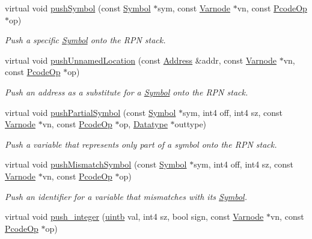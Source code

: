 \begin{DoxyCompactItemize}
virtual void \mbox{\hyperlink{class_print_c_a22e493008d4ba06482b42fe1875be235}{push\+Symbol}} (const \mbox{\hyperlink{class_symbol}{Symbol}} $\ast$sym, const \mbox{\hyperlink{class_varnode}{Varnode}} $\ast$vn, const \mbox{\hyperlink{class_pcode_op}{Pcode\+Op}} $\ast$op)
\begin{DoxyCompactList}\small\item\em Push a specific \mbox{\hyperlink{class_symbol}{Symbol}} onto the R\+PN stack. \end{DoxyCompactList}\item 
virtual void \mbox{\hyperlink{class_print_c_a5d9f2db7f218e2e994b741940155db52}{push\+Unnamed\+Location}} (const \mbox{\hyperlink{class_address}{Address}} \&addr, const \mbox{\hyperlink{class_varnode}{Varnode}} $\ast$vn, const \mbox{\hyperlink{class_pcode_op}{Pcode\+Op}} $\ast$op)
\begin{DoxyCompactList}\small\item\em Push an address as a substitute for a \mbox{\hyperlink{class_symbol}{Symbol}} onto the R\+PN stack. \end{DoxyCompactList}\item 
virtual void \mbox{\hyperlink{class_print_c_a0e8ab66b834858fbace8fd20357b5a63}{push\+Partial\+Symbol}} (const \mbox{\hyperlink{class_symbol}{Symbol}} $\ast$sym, int4 off, int4 sz, const \mbox{\hyperlink{class_varnode}{Varnode}} $\ast$vn, const \mbox{\hyperlink{class_pcode_op}{Pcode\+Op}} $\ast$op, \mbox{\hyperlink{class_datatype}{Datatype}} $\ast$outtype)
\begin{DoxyCompactList}\small\item\em Push a variable that represents only part of a symbol onto the R\+PN stack. \end{DoxyCompactList}\item 
virtual void \mbox{\hyperlink{class_print_c_aaa8e530589a3d446db8f76b9a211f0fa}{push\+Mismatch\+Symbol}} (const \mbox{\hyperlink{class_symbol}{Symbol}} $\ast$sym, int4 off, int4 sz, const \mbox{\hyperlink{class_varnode}{Varnode}} $\ast$vn, const \mbox{\hyperlink{class_pcode_op}{Pcode\+Op}} $\ast$op)
\begin{DoxyCompactList}\small\item\em Push an identifier for a variable that mismatches with its \mbox{\hyperlink{class_symbol}{Symbol}}. \end{DoxyCompactList}\item 
virtual void \mbox{\hyperlink{class_print_c_aa85a02ccc13756ecac61350ffd409e80}{push\+\_\+integer}} (\mbox{\hyperlink{types_8h_a2db313c5d32a12b01d26ac9b3bca178f}{uintb}} val, int4 sz, bool sign, const \mbox{\hyperlink{class_varnode}{Varnode}} $\ast$vn, const \mbox{\hyperlink{class_pcode_op}{Pcode\+Op}} $\ast$op)

\end{DoxyCompactItemize}
